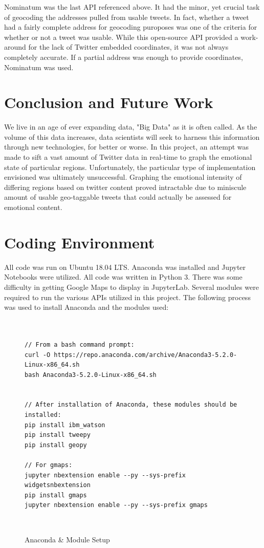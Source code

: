 \documentclass[12pt, oneside]{article}
\begin{document}
Nominatum was the last API referenced above. It had the minor, yet crucial task
of geocoding the addresses pulled from usable tweets. In fact, whether a
tweet had a fairly complete address for geocoding puroposes was one of the
criteria for whether or not a tweet was usable. While this open-source API
provided a work-around for the lack of Twitter embedded coordinates, it was not
always completely accurate. If a partial address was enough to provide
coordinates, Nominatum was used.


\section{Conclusion and Future Work}
We live in an age of ever expanding data, "Big Data" as it is often called. As
the volume of this data increases, data scientists will seek to harness this
information through new technologies, for better or worse. In
this project, an attempt was made to sift a vast amount of Twitter data in
real-time to graph the emotional state of particular regions. Unfortunately,
the particular type of implementation envisioned was ultimately unsuccessful.
Graphing the emotional intensity of differing regions based on twitter content
proved intractable due to miniscule amount of usable geo-taggable tweets that
could actually be assessed for emotional content.

\newpage{}


%


\newpage{}
\appendix{}
\section{Coding Environment}
All code was run on Ubuntu 18.04 LTS. Anaconda was installed and Jupyter
Notebooks were utilized. All code was written in Python 3. There was some
difficulty in getting Google Maps to display in JupyterLab. Several modules
were required to run the various APIs utilized in this project. The following process was used to install Anaconda and the modules used:

\begin{figure}[H]
\begin{lstlisting}


// From a bash command prompt:
curl -O https://repo.anaconda.com/archive/Anaconda3-5.2.0-Linux-x86_64.sh
bash Anaconda3-5.2.0-Linux-x86_64.sh


// After installation of Anaconda, these modules should be installed:
pip install ibm_watson
pip install tweepy
pip install geopy

// For gmaps:
jupyter nbextension enable --py --sys-prefix widgetsnbextension
pip install gmaps
jupyter nbextension enable --py --sys-prefix gmaps

\end{lstlisting}
\caption{Anaconda \& Module Setup}\
\label{fig:code}
\end{figure}
\end{document}
